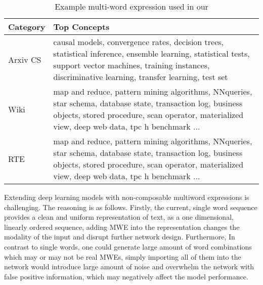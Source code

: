 
\begin{table}
\centering
\caption{Example multi-word expression used in our }\label{tab:dataset-stats}

\begin{tabular}{ll}
\toprule
\textbf{Category}  & \textbf{Top Concepts} \\
\midrule
Arxiv CS & \multicolumn{1}{p{.35\textwidth}}{\raggedright causal models, convergence rates, decision trees, statistical inference, ensemble learning, statistical tests, support vector machines, training instances, discriminative learning, transfer learning, test set
} \\
\midrule
Wiki & \multicolumn{1}{p{.35\textwidth}}{\raggedright map and reduce, pattern mining algorithms, NNqueries, star schema, database state, transaction log, business objects, stored procedure, scan operator, materialized view, deep web data, tpc h benchmark $\dots$
}  \\
\bottomrule
RTE & \multicolumn{1}{p{.35\textwidth}}{\raggedright map and reduce, pattern mining algorithms, NNqueries, star schema, database state, transaction log, business objects, stored procedure, scan operator, materialized view, deep web data, tpc h benchmark $\dots$
}  \\
\bottomrule
\end{tabular}
\end{table}


Extending deep learning models with non-composable multiword expressions is challenging.
The reasoning is as follows.
Firstly, 
the current, single word sequence provides a clean and uniform representation of text, as a 
one dimensional, linearly ordered sequence, 
adding MWE into the representation changes the modality of the input and disrupt 
further network design.
Furthermore, 
In contrast to single words, 
 one could generate large amount of word combinations which may or may not be real MWEs, 
simply importing all of them into the network would introduce large amount of noise and overwhelm the network with false positive  information,
which may negatively affect the model performance.



